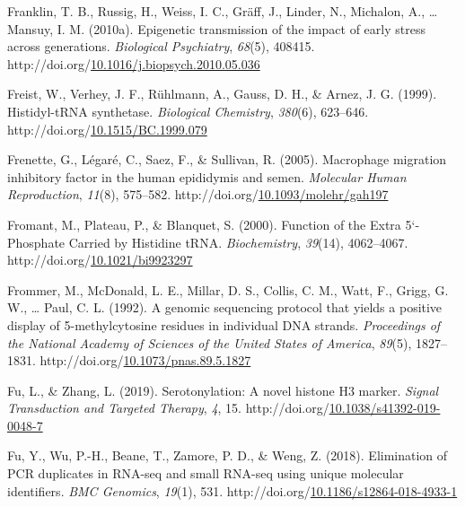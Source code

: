 \documentclass[12pt,twoside]{reedthesis}
\newlength{\cslhangindent}
\newenvironment{CSLReferences}[2] %
 {%
  \setlength{\parindent}{0pt}
  \ifodd #1 \everypar{\setlength{\hangindent}{\cslhangindent}}\ignorespaces\fi
  \ifnum #2 > 0
  \setlength{\parskip}{#2\baselineskip}
  \fi
 }%
 {}
\begin{document}
\begin{CSLReferences}{1}{0}
\leavevmode{}%
Franklin, T. B., Russig, H., Weiss, I. C., Gräff, J., Linder, N., Michalon, A., \ldots{} Mansuy, I. M. (2010a). Epigenetic transmission of the impact of early stress across generations. \emph{Biological Psychiatry}, \emph{68}(5), 408415. http://doi.org/\href{https://doi.org/10.1016/j.biopsych.2010.05.036}{10.1016/j.biopsych.2010.05.036}

\leavevmode{}%
Freist, W., Verhey, J. F., Rühlmann, A., Gauss, D. H., \& Arnez, J. G. (1999). Histidyl-tRNA synthetase. \emph{Biological Chemistry}, \emph{380}(6), 623--646. http://doi.org/\href{https://doi.org/10.1515/BC.1999.079}{10.1515/BC.1999.079}

\leavevmode{}%
Frenette, G., Légaré, C., Saez, F., \& Sullivan, R. (2005). Macrophage migration inhibitory factor in the human epididymis and semen. \emph{Molecular Human Reproduction}, \emph{11}(8), 575--582. http://doi.org/\href{https://doi.org/10.1093/molehr/gah197}{10.1093/molehr/gah197}

\leavevmode{}%
Fromant, M., Plateau, P., \& Blanquet, S. (2000). Function of the Extra 5{`}-Phosphate Carried by Histidine tRNA. \emph{Biochemistry}, \emph{39}(14), 4062--4067. http://doi.org/\href{https://doi.org/10.1021/bi9923297}{10.1021/bi9923297}

\leavevmode{}%
Frommer, M., McDonald, L. E., Millar, D. S., Collis, C. M., Watt, F., Grigg, G. W., \ldots{} Paul, C. L. (1992). A genomic sequencing protocol that yields a positive display of 5-methylcytosine residues in individual DNA strands. \emph{Proceedings of the National Academy of Sciences of the United States of America}, \emph{89}(5), 1827--1831. http://doi.org/\href{https://doi.org/10.1073/pnas.89.5.1827}{10.1073/pnas.89.5.1827}

\leavevmode{}%
Fu, L., \& Zhang, L. (2019). Serotonylation: A novel histone H3 marker. \emph{Signal Transduction and Targeted Therapy}, \emph{4}, 15. http://doi.org/\href{https://doi.org/10.1038/s41392-019-0048-7}{10.1038/s41392-019-0048-7}

\leavevmode{}%
Fu, Y., Wu, P.-H., Beane, T., Zamore, P. D., \& Weng, Z. (2018). Elimination of PCR duplicates in RNA-seq and small RNA-seq using unique molecular identifiers. \emph{BMC Genomics}, \emph{19}(1), 531. http://doi.org/\href{https://doi.org/10.1186/s12864-018-4933-1}{10.1186/s12864-018-4933-1}


\end{CSLReferences}
\end{document}
